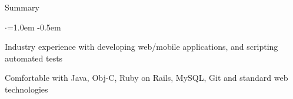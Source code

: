 \documentclass{resume} %
\begin{document}
	
	
	\begin{rSection}{Summary}
		\vspace {0.5em}
		\begin{list}{$\cdot$}{\leftmargin=1.0em}
			\itemsep -0.5em \vspace{-0.5em}
			\item Industry experience with developing web/mobile applications, and scripting automated tests
			\item Comfortable with Java, Obj-C, Ruby on Rails, MySQL, Git and standard web technologies
			
		\end{list}
		\vspace{0.5em}
	\end{rSection}
	
	
\end{document}
